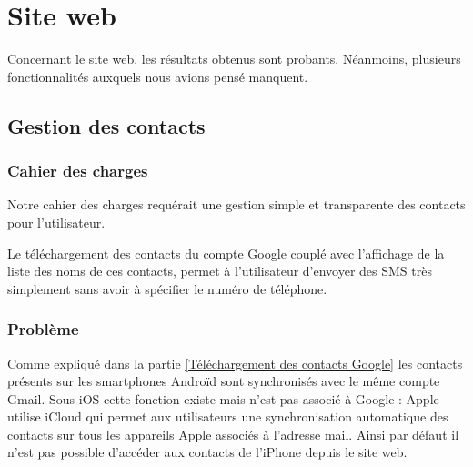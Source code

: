 \section{Site web}

Concernant le site web, les résultats obtenus sont probants.
Néanmoins, plusieurs fonctionnalités auxquels nous avions pensé manquent.




\subsection{Gestion des contacts}


\subsubsection{Cahier des charges}

Notre cahier des charges requérait une gestion simple et transparente des contacts pour l'utilisateur.

Le téléchargement des contacts du compte Google couplé avec l'affichage de la liste des noms de ces contacts, permet à l'utilisateur d'envoyer des SMS très simplement sans avoir à spécifier le numéro de téléphone.


\subsubsection{Problème}

Comme expliqué dans la partie \ref{Téléchargement des contacts Google} les contacts présents sur les smartphones Androïd sont synchronisés avec le même compte Gmail.
Sous iOS cette fonction existe mais n'est pas associé à Google : Apple utilise iCloud qui permet aux utilisateurs une synchronisation automatique des contacts sur tous les appareils Apple associés à l'adresse mail.
Ainsi par défaut il n'est pas possible d'accéder aux contacts de l'iPhone depuis le site web.

